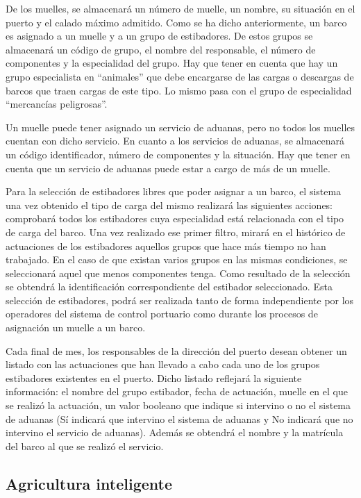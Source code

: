 \documentclass{db-practice}
\begin{document}
De los muelles, se almacenará un número de muelle, un nombre, su situación en el puerto y el calado máximo admitido. Como se ha dicho anteriormente, un barco es asignado a un muelle y a un grupo de estibadores. De estos grupos se almacenará un código de grupo, el nombre del responsable, el número de componentes y la especialidad del grupo. Hay que tener en cuenta que hay un grupo especialista en “animales” que debe encargarse de las cargas o descargas de barcos que traen cargas de este tipo. Lo mismo pasa con el grupo de especialidad “mercancías peligrosas”.

Un muelle puede tener asignado un servicio de aduanas, pero no todos los muelles cuentan con dicho servicio. En cuanto a los servicios de aduanas, se almacenará un código identificador, número de componentes y la situación. Hay que tener en cuenta que un servicio de aduanas puede estar a cargo de más de un muelle.

Para la selección de estibadores libres que poder asignar a un barco, el sistema una vez obtenido el tipo de carga del mismo realizará las siguientes acciones: comprobará todos los estibadores cuya especialidad está relacionada con el tipo de carga del barco. Una vez realizado ese primer filtro, mirará en el histórico de actuaciones de los estibadores aquellos grupos que hace más tiempo no han trabajado. En el caso de que existan varios grupos en las mismas condiciones, se seleccionará aquel que menos componentes tenga. Como resultado de la selección se obtendrá la identificación correspondiente del estibador seleccionado. Esta selección de estibadores, podrá ser realizada tanto de forma independiente por los operadores del sistema de control portuario como durante los procesos de asignación un muelle a un barco.

Cada final de mes, los responsables de la dirección del puerto desean obtener un listado con las actuaciones que han llevado a cabo cada uno de los grupos estibadores existentes en el puerto. Dicho listado reflejará la siguiente información: el nombre del grupo estibador, fecha de actuación, muelle en el que se realizó la actuación, un valor booleano que indique si intervino o no el sistema de aduanas (Sí indicará que intervino el sistema de aduanas y No indicará que no intervino el servicio de aduanas). Además se obtendrá el nombre y la matrícula del barco al que se realizó el servicio.

\subsection{Agricultura inteligente}
\end{document}
